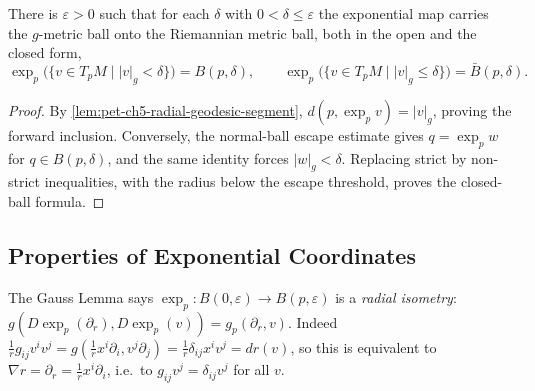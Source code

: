 \begin{corollary}
  \label{cor:pet-ch5-metric-ball-image}


  There is $\varepsilon>0$ such that for each $\delta$ with $0<\delta\le\varepsilon$
  the exponential map carries the $g$-metric ball onto the Riemannian metric ball,
  both in the open and the closed form,
  \[
    \exp_p\bigl(\{v\in T_pM\mid |v|_g<\delta\}\bigr)=B(p,\delta),\qquad
    \exp_p\bigl(\{v\in T_pM\mid |v|_g\le\delta\}\bigr)=\bar B(p,\delta).
  \]
\end{corollary}
\begin{proof}

  \sketch
  By \cref{lem:pet-ch5-radial-geodesic-segment},
  $d(p,\exp_pv)=|v|_g$, proving the forward inclusion.  Conversely, the normal-ball
  escape estimate gives $q=\exp_pw$ for $q\in B(p,\delta)$, and the same identity
  forces $|w|_g<\delta$.  Replacing strict by non-strict inequalities, with the
  radius below the escape threshold, proves the closed-ball formula.
\end{proof}

\subsection{Properties of Exponential Coordinates}

\begin{remark}
  \label{rem:pet-ch5-radial-isometry}


  The Gauss Lemma says $\exp_p:B(0,\varepsilon)\to B(p,\varepsilon)$ is a
  \emph{radial isometry}: $g(D\exp_p(\partial_r),D\exp_p(v))=g_p(\partial_r,v)$.
  Indeed $\tfrac1rg_{ij}v^iv^j=g(\tfrac1rx^i\partial_i,v^j\partial_j)=
  \tfrac1r\delta_{ij}x^iv^j=dr(v)$, so this is equivalent to $\nabla r=\partial_r=
  \tfrac1rx^i\partial_i$, i.e.\ to $g_{ij}v^j=\delta_{ij}v^j$ for all $v$.
\end{remark}

